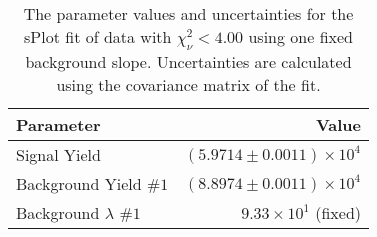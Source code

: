 
\begin{table}[ht]
    \begin{center}
        \begin{tabular}{lr}\toprule
            Parameter & Value \\\midrule
            Signal Yield & $(5.9714 \pm 0.0011) \times 10^{4}$ \\
            Background Yield $\#1$ & $(8.8974 \pm 0.0011) \times 10^{4}$ \\
            Background $\lambda$ $\#1$ & $9.33 \times 10^{1}$ (fixed) \\\bottomrule
        \end{tabular}
        \caption{The parameter values and uncertainties for the sPlot fit of data with $\chi^2_\nu < 4.00$ using one fixed background slope. Uncertainties are calculated using the covariance matrix of the fit.}\label{tab:splot-fit-results-chisqdof-4.00-fixed-1}
    \end{center}
\end{table}
